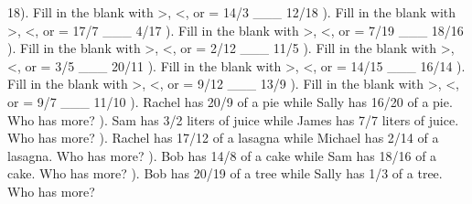 \documentclass{article}%
\begin{document}
18). Fill in the blank with >, <, or = 14/3 \_\_\_ 12/18%
\newline%
\newline%
). Fill in the blank with >, <, or = 17/7 \_\_\_ 4/17%
\newline%
\newline%
). Fill in the blank with >, <, or = 7/19 \_\_\_ 18/16%
\newline%
\newline%
). Fill in the blank with >, <, or = 2/12 \_\_\_ 11/5%
\newline%
\newline%
). Fill in the blank with >, <, or = 3/5 \_\_\_ 20/11%
\newline%
\newline%
). Fill in the blank with >, <, or = 14/15 \_\_\_ 16/14%
\newline%
\newline%
). Fill in the blank with >, <, or = 9/12 \_\_\_ 13/9%
\newline%
\newline%
). Fill in the blank with >, <, or = 9/7 \_\_\_ 11/10%
\newline%
\newline%
). Rachel has 20/9 of a pie while Sally has 16/20 of a pie. Who has more?%
\newline%
\newline%
). Sam has 3/2 liters of juice while James has 7/7 liters of juice. Who has more?%
\newline%
\newline%
). Rachel has 17/12 of a lasagna while Michael has 2/14 of a lasagna. Who has more?%
\newline%
\newline%
). Bob has 14/8 of a cake while Sam has 18/16 of a cake. Who has more?%
\newline%
\newline%
). Bob has 20/19 of a tree while Sally has 1/3 of a tree. Who has more?%
\end{document}
